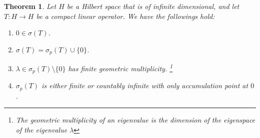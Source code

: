 \documentclass[11pt]{book}
\theoremstyle{break}
\theoremstyle{break}
\newtheorem{thm}{Theorem}[section]
\begin{document}
\begin{thm}
Let $H$ be a Hilbert space that is of infinite dimensional, and let $T:H \to H$ be a compact linear operator. We have the followings hold:
\begin{enumerate}[topsep=3pt,itemsep=-1ex,partopsep=1ex,parsep=1ex]
\item $0 \in \sigma(T)$.
\item $\sigma(T) = \sigma_p(T) \cup \{0\}$.
\item $\lambda \in \sigma_p(T) \setminus \{0\}$ has finite geometric multiplicity. \footnote{The geometric multiplicity of an eigenvalue is the dimension of the eigenspace of the eigenvalue $\lambda$}
\item $\sigma_p(T)$ is either finite or countably infinite with only accumulation point at $0$. 
\end{enumerate}
\end{thm}
\end{document}
